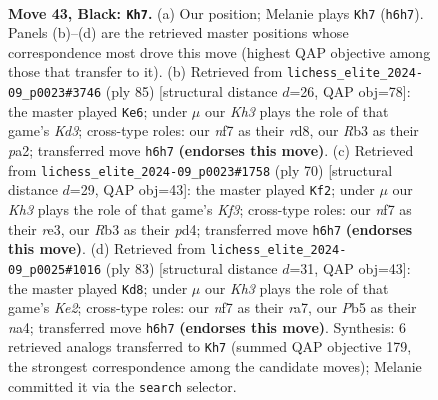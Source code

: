 \documentclass[11pt]{article}
\begin{document}
\clearpage

\begin{figure}[p]\centering
\begin{subfigure}{0.46\textwidth}\centering
\resizebox{\linewidth}{!}{%
\newchessgame
\chessboard[
  setfen={R7/5Np1/4pp1k/1p5p/3P1P1P/1r2P1PK/8/8 b - - 7 43},
  showmover=false,
  pgfstyle=straightmove, color=movearrow, markmove={h6-h7}
]}
\caption{}
\end{subfigure}\hfill
\begin{subfigure}{0.46\textwidth}\centering
\resizebox{\linewidth}{!}{%
\newchessgame
\chessboard[
  setfen={3R4/1r3p1p/2pk2p1/2p5/2P1KPP1/1P5P/P7/8 b - - 1 43},
  showmover=false,
  pgfstyle=straightmove, color=movearrow, markmove={d6-e6}
]}
\caption{}
\end{subfigure}
\\[4pt]
\begin{subfigure}{0.46\textwidth}\centering
\resizebox{\linewidth}{!}{%
\newchessgame
\chessboard[
  setfen={8/1p3k2/p1p3p1/2P2pP1/1P1p1P1P/4rK2/8/1R6 w - - 2 36},
  showmover=false,
  pgfstyle=straightmove, color=movearrow, markmove={f3-f2}
]}
\caption{}
\end{subfigure}\hfill
\begin{subfigure}{0.46\textwidth}\centering
\resizebox{\linewidth}{!}{%
\newchessgame
\chessboard[
  setfen={8/R3k1p1/4p2p/4P2P/Nrp1PPP1/4K3/8/2n5 b - - 1 42},
  showmover=false,
  pgfstyle=straightmove, color=movearrow, markmove={e7-d8}
]}
\caption{}
\end{subfigure}
\caption{\textbf{Move 43, Black: \texttt{Kh7}.} (a) Our position; Melanie plays \texttt{Kh7} (\texttt{h6h7}). Panels (b)--(d) are the retrieved master positions whose correspondence most drove this move (highest QAP objective among those that transfer to it). (b) Retrieved from \texttt{lichess\_elite\_2024-09\_p0023\#3746} (ply 85) [structural distance $d$=26, QAP obj=78]: the master played \texttt{Ke6}; under $\mu$ our \emph{Kh3} plays the role of that game's \emph{Kd3}; cross-type roles: our \emph{n}f7 as their \emph{r}d8, our \emph{R}b3 as their \emph{p}a2; transferred move \texttt{h6h7} \textbf{(endorses this move)}. (c) Retrieved from \texttt{lichess\_elite\_2024-09\_p0023\#1758} (ply 70) [structural distance $d$=29, QAP obj=43]: the master played \texttt{Kf2}; under $\mu$ our \emph{Kh3} plays the role of that game's \emph{Kf3}; cross-type roles: our \emph{n}f7 as their \emph{r}e3, our \emph{R}b3 as their \emph{p}d4; transferred move \texttt{h6h7} \textbf{(endorses this move)}. (d) Retrieved from \texttt{lichess\_elite\_2024-09\_p0025\#1016} (ply 83) [structural distance $d$=31, QAP obj=43]: the master played \texttt{Kd8}; under $\mu$ our \emph{Kh3} plays the role of that game's \emph{Ke2}; cross-type roles: our \emph{n}f7 as their \emph{r}a7, our \emph{P}b5 as their \emph{n}a4; transferred move \texttt{h6h7} \textbf{(endorses this move)}. Synthesis: 6 retrieved analogs transferred to \texttt{Kh7} (summed QAP objective 179, the strongest correspondence among the candidate moves); Melanie committed it via the \texttt{search} selector.}
\label{fig:thought-m85}
\end{figure}
\end{document}
